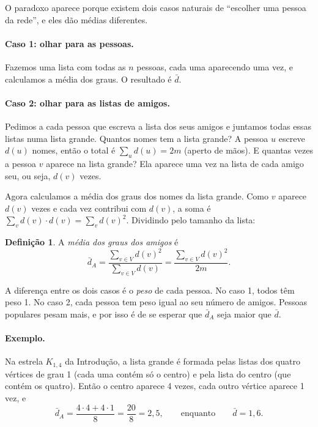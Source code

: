 \documentclass[12pt,a4paper]{article}
\theoremstyle{plain}
\theoremstyle{definition}
\newtheorem{definicao}{Definição}
\theoremstyle{remark}
\newcommand{\dm}{\bar d}          %
\newcommand{\dA}{\bar d_{A}}      %
\begin{document}
O paradoxo aparece porque existem dois casos naturais de “escolher uma
pessoa da rede”, e eles dão médias diferentes.

\paragraph{Caso 1: olhar para as pessoas.} Fazemos uma lista com todas
as $n$ pessoas, cada uma aparecendo uma vez, e calculamos a média dos
graus. O resultado é $\dm$.

\paragraph{Caso 2: olhar para as listas de amigos.} Pedimos a cada
pessoa que escreva a lista dos seus amigos e juntamos todas essas listas
numa lista grande. Quantos nomes tem a lista grande? A pessoa $u$
escreve $d(u)$ nomes, então o total é $\sum_u d(u) = 2m$ (aperto de
mãos). E quantas vezes a pessoa $v$ aparece na lista grande? Ela aparece
uma vez na lista de cada amigo seu, ou seja, $d(v)$ vezes.

Agora calculamos a média dos graus dos nomes da lista grande. Como $v$
aparece $d(v)$ vezes e cada vez contribui com $d(v)$, a soma é
$\sum_v d(v)\cdot d(v) = \sum_v d(v)^2$. Dividindo pelo tamanho da lista:

\begin{definicao}
A \emph{média dos graus dos amigos} é
\[
\dA = \frac{\sum_{v\in V} d(v)^2}{\sum_{v\in V} d(v)}
     = \frac{\sum_{v\in V} d(v)^2}{2m}.
\]
\end{definicao}

A diferença entre os dois casos é o \emph{peso} de cada pessoa. No
caso 1, todos têm peso 1. No caso 2, cada pessoa tem peso igual ao
seu número de amigos. Pessoas populares pesam mais, e por isso é de se
esperar que $\dA$ seja maior que $\dm$.

\paragraph{Exemplo.} Na estrela $K_{1,4}$ da Introdução, a lista grande
é formada pelas listas dos quatro vértices de grau 1 (cada uma contém só
o centro) e pela lista do centro (que contém os quatro). Então o centro
aparece 4 vezes, cada outro vértice aparece 1 vez, e
\[
\dA = \frac{4\cdot 4 + 4\cdot 1}{8} = \frac{20}{8} = 2{,}5,
\qquad\text{enquanto}\qquad \dm = 1{,}6 .
\]

\end{document}
